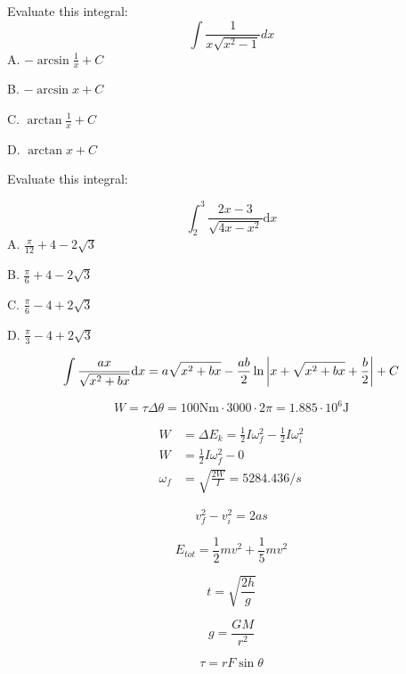 \documentclass{article}
\numberwithin{equation}{section}
\begin{document}
\newpage

Evaluate this integral:
\[
    \int \frac{1}{x\sqrt{x^2-1}}{d}x
\]
A. $-\arcsin{\frac{1}{x}}+ C$

B. $-\arcsin{x} + C$

C. $\arctan{\frac{1}{x}} + C$

D. $\arctan{x} +C$ 


Evaluate this integral:

\[
    \int_2^3 \frac{2x-3}{\sqrt{4x-x^2}} \mathrm{d}x
\]  
A. $\frac{\pi}{12} + 4 - 2\sqrt{3}$

B. $\frac{\pi}{6} + 4 - 2\sqrt{3}$

C. $\frac{\pi}{6} - 4 + 2\sqrt{3}$

D. $\frac{\pi}{3} - 4 + 2\sqrt{3}$

\[
    \int \frac{ax}{\sqrt{x^2+bx}}\mathrm{d}x = a\sqrt{x^2+bx}-\frac{ab}{2}\ln{\abs{x+\sqrt{x^2+bx}+\frac{b}{2}}}+C
\]

\[
W = \tau \Delta \theta = 100 \text{Nm} \cdot 3000\cdot 2\pi = 1.885\cdot 10^6 \text{J}
\]

\[
\begin{split}
    W &= \Delta E_k = \frac{1}{2}I\omega_f^2 - \frac{1}{2}I\omega_i^2\\
    W &= \frac{1}{2}I\omega_f^2 - 0\\
    \omega_f &= \sqrt{\frac{2W}{I}} = 5284.436 /s
\end{split}
\]

\[
v_f^2 - v_i^2 = 2as
\]

\[
E_{tot} = \frac{1}{2}mv^2 + \frac{1}{5}mv^2
\]

\[
t=\sqrt{\frac{2h}{g}}
\]

\[
g = \frac{GM}{r^2}
\]

\[
\tau = rF\sin \theta
\]
\end{document}
